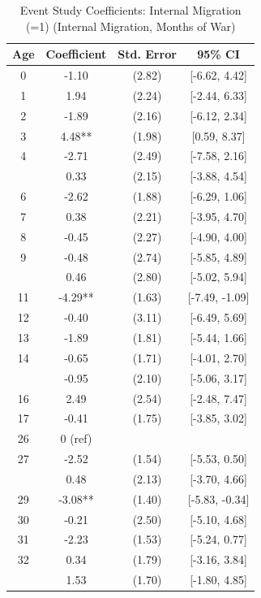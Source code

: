\begin{table}[!h]
\centering
\caption{\label{tab:event_study_8d_internal_migration_months}Event Study Coefficients: Internal Migration (=1) (Internal Migration, Months of War)}
\centering
\fontsize{9}{11}\selectfont
\begin{threeparttable}
\begin{tabular}[t]{cccc}
\toprule
Age & Coefficient & Std. Error & 95\% CI\\
\midrule
0 & -1.10 & (2.82) & {}[-6.62, 4.42]\\
1 & 1.94 & (2.24) & {}[-2.44, 6.33]\\
2 & -1.89 & (2.16) & {}[-6.12, 2.34]\\
3 & 4.48** & (1.98) & {}[0.59, 8.37]\\
4 & -2.71 & (2.49) & {}[-7.58, 2.16]\\
\addlinespace
5 & 0.33 & (2.15) & {}[-3.88, 4.54]\\
6 & -2.62 & (1.88) & {}[-6.29, 1.06]\\
7 & 0.38 & (2.21) & {}[-3.95, 4.70]\\
8 & -0.45 & (2.27) & {}[-4.90, 4.00]\\
9 & -0.48 & (2.74) & {}[-5.85, 4.89]\\
\addlinespace
10 & 0.46 & (2.80) & {}[-5.02, 5.94]\\
11 & -4.29** & (1.63) & {}[-7.49, -1.09]\\
12 & -0.40 & (3.11) & {}[-6.49, 5.69]\\
13 & -1.89 & (1.81) & {}[-5.44, 1.66]\\
14 & -0.65 & (1.71) & {}[-4.01, 2.70]\\
\addlinespace
15 & -0.95 & (2.10) & {}[-5.06, 3.17]\\
16 & 2.49 & (2.54) & {}[-2.48, 7.47]\\
17 & -0.41 & (1.75) & {}[-3.85, 3.02]\\
26 & 0 (ref) &  & \\
27 & -2.52 & (1.54) & {}[-5.53, 0.50]\\
\addlinespace
28 & 0.48 & (2.13) & {}[-3.70, 4.66]\\
29 & -3.08** & (1.40) & {}[-5.83, -0.34]\\
30 & -0.21 & (2.50) & {}[-5.10, 4.68]\\
31 & -2.23 & (1.53) & {}[-5.24, 0.77]\\
32 & 0.34 & (1.79) & {}[-3.16, 3.84]\\
\addlinespace
33 & 1.53 & (1.70) & {}[-1.80, 4.85]\\

\end{tabular}
\end{threeparttable}
\end{table}
